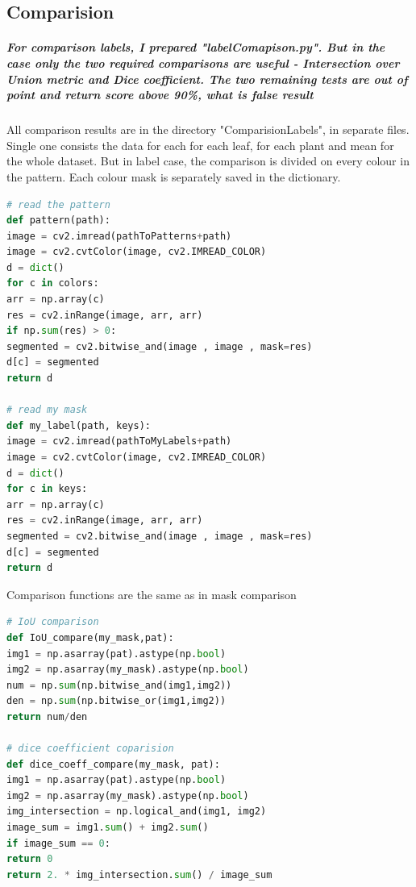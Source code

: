 \documentclass[12pt]{article}
\begin{document}
\newpage

\subsection{Comparision}

\subparagraph{
For comparison labels, I prepared "labelComapison.py". But in the case only the two required comparisons are useful - Intersection over Union metric and Dice coefficient. The two remaining tests are out of point and return score above 90\%, what is false result \\
}

All comparison results are in the directory "ComparisionLabels", in separate files.
Single one consists the data for each for each leaf, for each plant and mean for the whole dataset. But in label case, the comparison is divided on every colour in the pattern.
Each colour mask is separately saved in the dictionary.

\begin{lstlisting}[language=Python]
# read the pattern
def pattern(path):
image = cv2.imread(pathToPatterns+path)
image = cv2.cvtColor(image, cv2.IMREAD_COLOR)
d = dict()
for c in colors:
arr = np.array(c)
res = cv2.inRange(image, arr, arr)
if np.sum(res) > 0:
segmented = cv2.bitwise_and(image , image , mask=res)
d[c] = segmented
return d

# read my mask
def my_label(path, keys):
image = cv2.imread(pathToMyLabels+path)
image = cv2.cvtColor(image, cv2.IMREAD_COLOR)
d = dict()
for c in keys:
arr = np.array(c)
res = cv2.inRange(image, arr, arr)
segmented = cv2.bitwise_and(image , image , mask=res)
d[c] = segmented
return d
\end{lstlisting}

Comparison functions are the same as in mask comparison

\begin{lstlisting}[language=Python]
# IoU comparison
def IoU_compare(my_mask,pat):
img1 = np.asarray(pat).astype(np.bool)
img2 = np.asarray(my_mask).astype(np.bool)
num = np.sum(np.bitwise_and(img1,img2))
den = np.sum(np.bitwise_or(img1,img2))
return num/den

# dice coefficient coparision
def dice_coeff_compare(my_mask, pat):
img1 = np.asarray(pat).astype(np.bool)
img2 = np.asarray(my_mask).astype(np.bool)
img_intersection = np.logical_and(img1, img2)
image_sum = img1.sum() + img2.sum()
if image_sum == 0:
return 0
return 2. * img_intersection.sum() / image_sum
\end{lstlisting}
\end{document}
